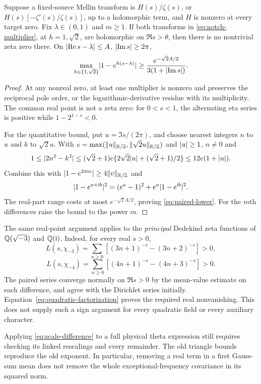\begin{proposition}\label{prop:paired-notches}
Suppose a fixed-source Mellin transform is $H(s)/\zeta(s)$, or $H(s)[-\zeta'(s)/\zeta(s)]$, up to a holomorphic term, and $H$ is nonzero at every target zero. Fix $\lambda\in(0,1)$ and $m\ge1$. If both transforms in \eqref{eq:notch-multiplier}, at $h=1,\sqrt2$, are holomorphic on $\Re s>\theta$, then there is no nontrivial zeta zero there. On $\lvert\operatorname{Re} s-\lambda\rvert\le A$, $\lvert\operatorname{Im} s\rvert\ge2\pi$,
\begin{equation}\label{eq:paired-lower}
 \max_{h\in\{1,\sqrt2\}}\lvert1-e^{h(s-\lambda)}\rvert
 \ge\frac{e^{-\sqrt2 A/2}}{3(1+\lvert\operatorname{Im} s\rvert)}.
\end{equation}
\end{proposition}
\begin{proof}
At any nonreal zero, at least one multiplier is nonzero and preserves the reciprocal pole order, or the logarithmic-derivative residue with its multiplicity. The common real point is not a zeta zero: for $0<s<1$, the alternating eta series is positive while $1-2^{1-s}<0$.

For the quantitative bound, put $u=\Im s/(2\pi)$, and choose nearest integers $n$ to $u$ and $k$ to $\sqrt2u$. With $e=\max(\lVert u\rVert_{\mathbb R/\mathbb Z},\lVert\sqrt2u\rVert_{\mathbb R/\mathbb Z})$ and $\lvert u\rvert\ge1$, $n\ne0$ and
\[
 1\le\lvert2n^2-k^2\rvert
 \le(\sqrt2+1)e\{2\sqrt2\lvert u\rvert+(\sqrt2+1)/2\}
 \le12e(1+\lvert u\rvert).
\]
Combine this with $\lvert1-e^{2\pi\mathrm i v}\rvert\ge4\lVert v\rVert_{\mathbb R/\mathbb Z}$ and
\[
 \lvert1-e^{a+\mathrm i b}\rvert^2=(e^a-1)^2+e^a\lvert1-e^{\mathrm i b}\rvert^2.
\]
The real-part range costs at most $e^{-\sqrt2 A/2}$, proving \eqref{eq:paired-lower}. For the $m$th differences raise the bound to the power $m$.
\end{proof}

The same real-point argument applies to the \emph{principal} Dedekind zeta functions of $\mathbb Q(\sqrt{-3})$ and $\mathbb Q(\mathrm i)$. Indeed, for every real $s>0$,
\[
 L(s,\chi_{-3})=\sum_{n\ge0}[(3n+1)^{-s}-(3n+2)^{-s}]>0,
\]
\[
 L(s,\chi_{-4})=\sum_{n\ge0}[(4n+1)^{-s}-(4n+3)^{-s}]>0.
\]
The paired series converge normally on $\Re s>0$ by the mean-value estimate on each difference, and agree with the Dirichlet series initially. Equation~\eqref{eq:quadratic-factorization} proves the required real nonvanishing. This does not supply such a sign argument for every quadratic field or every auxiliary character.

Applying \eqref{eq:scale-difference} to a full physical theta expression still requires checking its linked rescalings and every remainder. The old triangle bounds reproduce the old exponent. In particular, removing a real term in a first Gauss-sum mean does not remove the whole exceptional-frequency covariance in its squared norm.

